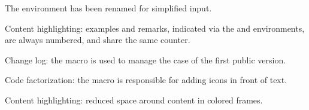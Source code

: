 \documentclass[12pt, a4paper]{article}
\begin{document}
\begin{tdocbreak}
	\item The  environment has been renamed  for simplified input.
	
	\item Content highlighting: examples and remarks, indicated via the  and  environments, are always numbered, and share the same counter.
\end{tdocbreak}


\begin{tdocnew}
    \item Change log: the  macro is used to manage the case of the first public version.

    \item Code factorization: the  macro is responsible for adding icons in front of text.
\end{tdocnew}


\begin{tdocupdate}
    \item Content highlighting: reduced space around content in colored frames.
\end{tdocupdate}
\end{document}
